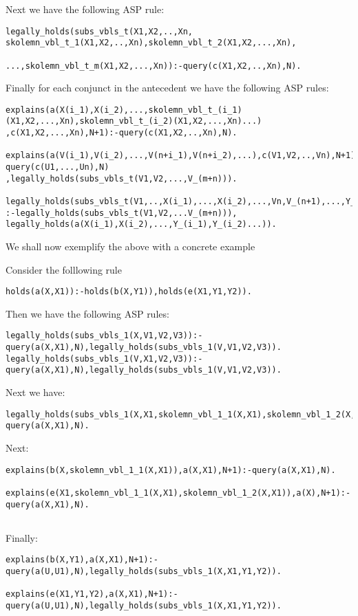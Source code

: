 \documentclass{article}
\begin{document}
Next we have the following ASP rule:
\begin{verbatim}
legally_holds(subs_vbls_t(X1,X2,..,Xn, skolemn_vbl_t_1(X1,X2,..,Xn),skolemn_vbl_t_2(X1,X2,...,Xn),

...,skolemn_vbl_t_m(X1,X2,...,Xn)):-query(c(X1,X2,..,Xn),N).
\end{verbatim}

Finally for each conjunct in the antecedent we have the following ASP rules:
\begin{verbatim}
explains(a(X(i_1),X(i_2),...,skolemn_vbl_t_(i_1)(X1,X2,...,Xn),skolemn_vbl_t_(i_2)(X1,X2,...,Xn)...)
,c(X1,X2,...,Xn),N+1):-query(c(X1,X2,..,Xn),N).  

explains(a(V(i_1),V(i_2),...,V(n+i_1),V(n+i_2),...),c(V1,V2,..,Vn),N+1):-query(c(U1,...,Un),N)
,legally_holds(subs_vbls_t(V1,V2,...,V_(m+n))).

legally_holds(subs_vbls_t(V1,..,X(i_1),...,X(i_2),...,Vn,V_(n+1),...,Y_(i_1),...,Y_(i_2),...,V(n+m)))
:-legally_holds(subs_vbls_t(V1,V2,...V_(m+n))),
legally_holds(a(X(i_1),X(i_2),...,Y_(i_1),Y_(i_2)...)).
\end{verbatim}
We shall now exemplify the above with a concrete example

Consider the folllowing rule
\begin{verbatim}
holds(a(X,X1)):-holds(b(X,Y1)),holds(e(X1,Y1,Y2)).
\end{verbatim}

Then we have the following ASP rules:
\begin{verbatim}
legally_holds(subs_vbls_1(X,V1,V2,V3)):-query(a(X,X1),N),legally_holds(subs_vbls_1(V,V1,V2,V3)).
legally_holds(subs_vbls_1(V,X1,V2,V3)):-query(a(X,X1),N),legally_holds(subs_vbls_1(V,V1,V2,V3)).
\end{verbatim}

Next we have:
\begin{verbatim}
legally_holds(subs_vbls_1(X,X1,skolemn_vbl_1_1(X,X1),skolemn_vbl_1_2(X,X1))):-query(a(X,X1),N).
\end{verbatim}

Next:
\begin{verbatim}
explains(b(X,skolemn_vbl_1_1(X,X1)),a(X,X1),N+1):-query(a(X,X1),N).

explains(e(X1,skolemn_vbl_1_1(X,X1),skolemn_vbl_1_2(X,X1)),a(X),N+1):-query(a(X,X1),N).
    
\end{verbatim}

Finally:
\begin{verbatim}
explains(b(X,Y1),a(X,X1),N+1):-query(a(U,U1),N),legally_holds(subs_vbls_1(X,X1,Y1,Y2)).

explains(e(X1,Y1,Y2),a(X,X1),N+1):-query(a(U,U1),N),legally_holds(subs_vbls_1(X,X1,Y1,Y2)).    
\end{verbatim}
\end{document}
